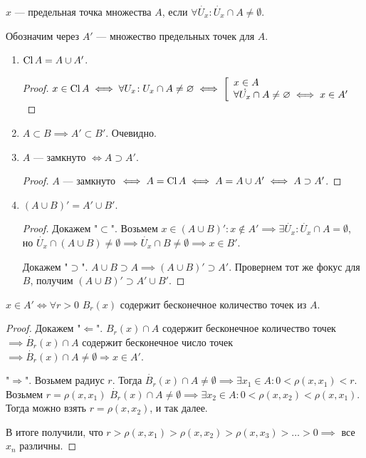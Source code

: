 \begin{definition}
    $x$ --- предельная точка множества  $A$, если  $\forall \dot{U_x}\!: \dot{U_x} \cap A \neq \emptyset$.

    Обозначим через  $A'$ --- множество предельных точек для  $A$.
\end{definition}
\begin{properties}
    \slashn
    \begin{enumerate}
        \item $\operatorname{Cl} A = A \cup A'$.
            \begin{proof}
                $x \in \operatorname{Cl} A \iff \forall U_x\!: U_x \cap A \neq \varnothing \iff \left[ \begin{array}{l} x \in A \\ \forall \dot{U_x} \cap A \neq \varnothing \iff x \in A' \end{array} \right.$
            \end{proof}
        \item $A \subset B \implies A' \subset B'$. Очевидно.
        \item  $A$ --- замкнуто  $\iff A \supset A'$. 
             \begin{proof}
                $A$ --- замкнуто  $\iff A = \operatorname{Cl} A \iff A = A \cup A' \iff A \supset A'$.
            \end{proof}
        \item $(A \cup B)' = A' \cup B'$.
             \begin{proof}
                Докажем "$\subset$". Возьмем $x \in (A \cup B)'\!: x \notin A' \implies \exists \dot{U_x}\!: \dot{U_x} \cap A = \emptyset$, но $\dot{U_x} \cap (A \cup B) \neq \emptyset \implies \dot{U_x} \cap B \neq \emptyset \implies x \in B'$.

                Докажем "$\supset$". $A \cup B \supset A \implies (A \cup B)' \supset A'$. Провернем тот же фокус для  $B$, получим  $(A \cup B)' \supset A' \cup B'$.
           \end{proof}
    \end{enumerate}
\end{properties}
\begin{theorem}
    $x \in A' \iff \forall r > 0$  $B_r(x)$ содержит бесконечное количество точек из  $A$.
\end{theorem}
\begin{proof}
    Докажем "$\Leftarrow$". $B_r(x) \cap A$ содержит бесконечное количество точек  $\implies \dot{B_r}(x) \cap A$ содержит бесконечное число точек  $\implies \dot{B_r}(x) \cap A \neq \emptyset \Rightarrow x \in A'$.

     "$\Rightarrow$". Возьмем радиус  $r$. Тогда  $\dot{B_r}(x) \cap A \neq \emptyset \implies \exists x_1 \in A\!: 0 < \rho(x, x_1) < r$. Возьмем $r = \rho(x, x_1)$ $\dot{B_r}(x) \cap A \neq \emptyset \implies \exists x_2 \in A\!: 0 < \rho(x, x_2) < \rho(x, x_1)$. Тогда можно взять $r = \rho(x, x_2)$, и так далее. 

     В итоге получили, что $r > \rho(x, x_1) > \rho(x, x_2) > \rho(x, x_3) > \ldots > 0 \implies$ все $x_n$ различны.
\end{proof}

